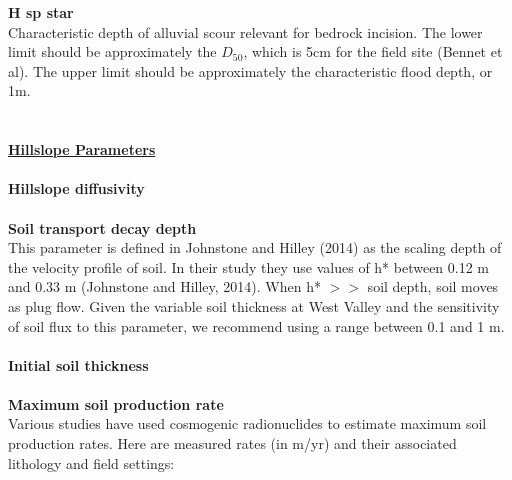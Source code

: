 \documentclass[12pt]{article}
\begin{document}
{\textbf{H sp star}
\\
Characteristic depth of alluvial scour relevant for bedrock incision. The lower limit should be approximately the $D_{50}$, which is 5cm for the field site (Bennet et al). The upper limit should be approximately the characteristic flood depth, or 1m. 
\\
\\
\\
\noindent
{\textbf{\Large{\underline{Hillslope Parameters}}}}
\\
\\
\noindent
{\textbf{Hillslope diffusivity}}
\\
\\
\noindent
{\textbf{Soil transport decay depth}}
\\
This parameter is defined in Johnstone and Hilley (2014) as the scaling depth of the velocity profile of soil. In their study they use values of h* between 0.12 m and 0.33 m (Johnstone and Hilley, 2014). When h* $>$$>$ soil depth, soil moves as plug flow. Given the variable soil thickness at West Valley and the sensitivity of soil flux to this parameter, we recommend using a range between 0.1 and 1 m. 
\\
\\
\noindent
{\textbf{Initial soil thickness}}
\\
\\
\noindent
{\textbf{Maximum soil production rate}}
\\
Various studies have used cosmogenic radionuclides to estimate maximum soil production rates. Here are measured rates (in m/yr) and their associated lithology and field settings:

}
\end{document}
